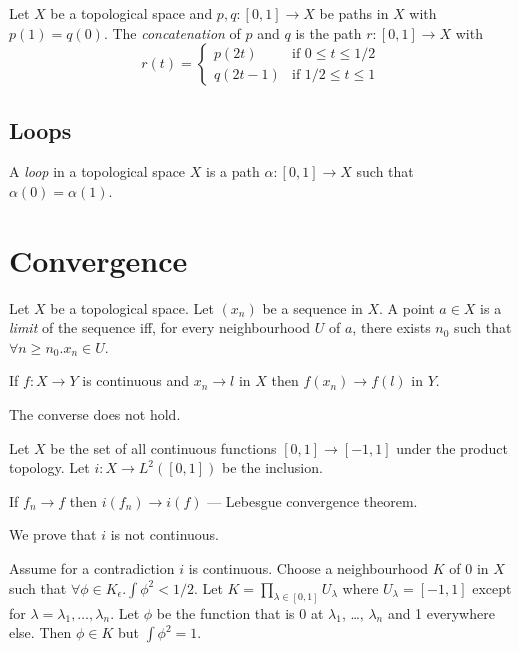 \begin{df}[Concatenation]
Let $X$ be a topological space and $p, q : [0,1] \rightarrow X$ be paths in $X$ with $p(1) = q(0)$. The \emph{concatenation} of $p$ and $q$ is the path $r : [0,1] \rightarrow X$ with
\[ r(t) = \begin{cases}
p(2t) & \text{if } 0 \leq t \leq 1/2 \\
q(2t-1) & \text{if } 1/2 \leq t \leq 1
\end{cases} \]
\end{df}

\subsection{Loops}

\begin{df}[Loop]
A \emph{loop} in a topological space $X$ is a path $\alpha : [0,1] \rightarrow X$ such that $\alpha(0) = \alpha(1)$.
\end{df}

\section{Convergence}

\begin{df}[Convergence]
Let $X$ be a topological space. Let $(x_n)$ be a sequence in $X$. A point $a \in X$ is a \emph{limit} of the sequence iff, for every neighbourhood $U$ of $a$, there exists $n_0$ such that $\forall n \geq n_0. x_n \in U$.
\end{df}

\begin{prop}
\label{prop:continuous_converge}
If $f : X \rightarrow Y$ is continuous and $x_n \rightarrow l$ in $X$ then $f(x_n) \rightarrow f(l)$ in $Y$.
\end{prop}


\begin{ex}
The converse does not hold.

Let $X$ be the set of all continuous functions $[0,1] \rightarrow [-1,1]$ under the product topology. Let $i : X \rightarrow L^2([0,1])$ be the inclusion.

If $f_n \rightarrow f$ then $i(f_n) \rightarrow i(f)$ --- Lebesgue convergence theorem.

We prove that $i$ is not continuous.

Assume for a contradiction $i$ is continuous. Choose a neighbourhood $K$ of 0 in $X$ such that $\forall \phi \in K _\epsilon. \int \phi^2 < 1/2$. Let $K = \prod_{\lambda \in [0,1]} U_\lambda$ where $U_\lambda = [-1,1]$ except for $\lambda = \lambda_1, \ldots, \lambda_n$. Let $\phi$ be the function that is 0 at $\lambda_1$, \ldots, $\lambda_n$ and 1 everywhere else. Then $\phi \in K$ but $\int \phi^2 = 1$.
\end{ex}

